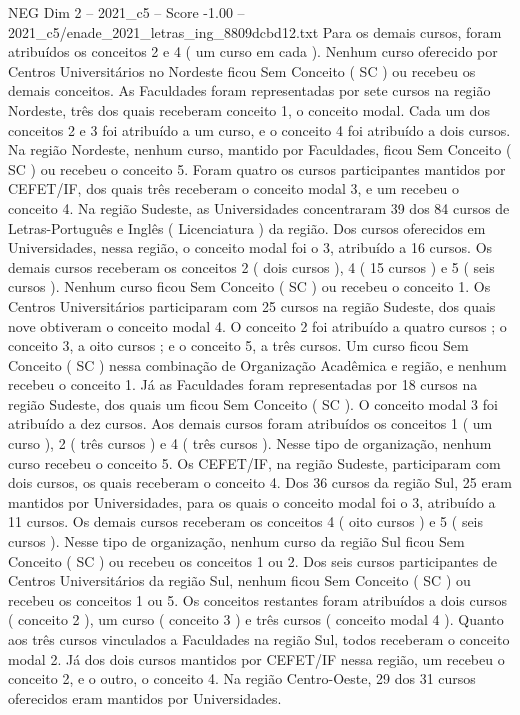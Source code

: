 \begin{textsample}{NEG Dim 2 – 2021\_c5 – Score -1.00 – 2021\_c5/enade\_2021\_letras\_ing\_8809dcbd12.txt}
Para os demais cursos, foram atribuídos os conceitos 2 e 4 ( um curso em cada ).
Nenhum curso oferecido por Centros Universitários no Nordeste ficou Sem Conceito ( SC ) ou recebeu os demais conceitos.
As Faculdades foram representadas por sete cursos na região Nordeste, três dos quais receberam conceito 1, o conceito modal.
Cada um dos conceitos 2 e 3 foi atribuído a um curso, e o conceito 4 foi atribuído a dois cursos.
Na região Nordeste, nenhum curso, mantido por Faculdades, ficou Sem Conceito ( SC ) ou recebeu o conceito 5.
Foram quatro os cursos participantes mantidos por CEFET/IF, dos quais três receberam o conceito modal 3, e um recebeu o conceito 4.
Na região Sudeste, as Universidades concentraram 39 dos 84 cursos de Letras-Português e Inglês ( Licenciatura ) da região.
Dos cursos oferecidos em Universidades, nessa região, o conceito modal foi o 3, atribuído a 16 cursos.
Os demais cursos receberam os conceitos 2 ( dois cursos ), 4 ( 15 cursos ) e 5 ( seis cursos ).
Nenhum curso ficou Sem Conceito ( SC ) ou recebeu o conceito 1.
Os Centros Universitários participaram com 25 cursos na região Sudeste, dos quais nove obtiveram o conceito modal 4.
O conceito 2 foi atribuído a quatro cursos ; o conceito 3, a oito cursos ; e o conceito 5, a três cursos.
Um curso ficou Sem Conceito ( SC ) nessa combinação de Organização Acadêmica e região, e nenhum recebeu o conceito 1.
Já as Faculdades foram representadas por 18 cursos na região Sudeste, dos quais um ficou Sem Conceito ( SC ).
O conceito modal 3 foi atribuído a dez cursos.
Aos demais cursos foram atribuídos os conceitos 1 ( um curso ), 2 ( três cursos ) e 4 ( três cursos ).
Nesse tipo de organização, nenhum curso recebeu o conceito 5.
Os CEFET/IF, na região Sudeste, participaram com dois cursos, os quais receberam o conceito 4.
Dos 36 cursos da região Sul, 25 eram mantidos por Universidades, para os quais o conceito modal foi o 3, atribuído a 11 cursos.
Os demais cursos receberam os conceitos 4 ( oito cursos ) e 5 ( seis cursos ).
Nesse tipo de organização, nenhum curso da região Sul ficou Sem Conceito ( SC ) ou recebeu os conceitos 1 ou 2.
Dos seis cursos participantes de Centros Universitários da região Sul, nenhum ficou Sem Conceito ( SC ) ou recebeu os conceitos 1 ou 5.
Os conceitos restantes foram atribuídos a dois cursos ( conceito 2 ), um curso ( conceito 3 ) e três cursos ( conceito modal 4 ).
Quanto aos três cursos vinculados a Faculdades na região Sul, todos receberam o conceito modal 2.
Já dos dois cursos mantidos por CEFET/IF nessa região, um recebeu o conceito 2, e o outro, o conceito 4.
Na região Centro-Oeste, 29 dos 31 cursos oferecidos eram mantidos por Universidades.

\end{textsample}
